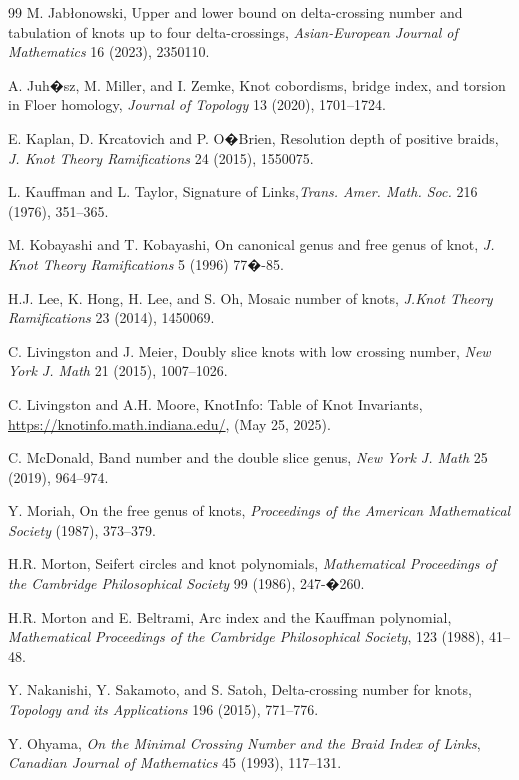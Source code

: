 \documentclass[pdftex, a4paper, 12pt, oneside]{amsart}
\numberwithin{equation}{section}
\theoremstyle{plain}
\theoremstyle{definition}
\begin{document}
\begin{thebibliography}{99}
		 M. Jab\l onowski, Upper and lower bound on delta-crossing number and tabulation of knots up to four delta-crossings, \emph{Asian-European Journal of Mathematics} 16 (2023), 2350110.
		
		 A. Juh�sz, M. Miller, and I. Zemke, Knot cobordisms, bridge index, and torsion in Floer homology,  \emph{Journal of Topology} 13 (2020), 1701--1724.
		
		 E. Kaplan, D. Krcatovich and P. O�Brien, Resolution depth of positive braids, \emph{J. Knot Theory Ramifications} 24 (2015), 1550075.
		
		 L. Kauffman and L. Taylor, Signature of Links,\emph{Trans. Amer. Math. Soc.} 216 (1976), 351--365.
		
		 M. Kobayashi and T. Kobayashi, On canonical genus and free genus of knot, \emph{J. Knot Theory Ramifications} 5 (1996) 77�-85.
		
		 H.J. Lee, K. Hong, H. Lee, and S. Oh, Mosaic number of knots, \emph{J.Knot Theory Ramifications} 23 (2014), 1450069. 
		
		 C. Livingston and J. Meier, Doubly slice knots with low crossing number, \emph{New York J. Math} 21 (2015), 1007--1026.
		
		 C. Livingston and A.H. Moore, KnotInfo: Table of Knot Invariants, \\\url{https://knotinfo.math.indiana.edu/}, (May 25, 2025).
		
		 C. McDonald, Band number and the double slice genus, \emph{New York J. Math} 25 (2019), 964--974.
		
		 Y. Moriah, On the free genus of knots, \emph{Proceedings of the American Mathematical Society} (1987), 373--379.
		
		 H.R. Morton, Seifert circles and knot polynomials, \emph{Mathematical Proceedings of the Cambridge Philosophical Society} 99 (1986), 247-�260.
		
		 H.R. Morton and E. Beltrami, Arc index and the Kauffman polynomial, \emph{Mathematical Proceedings of the Cambridge Philosophical Society}, 123 (1988), 41--48.
		
		 Y. Nakanishi, Y.  Sakamoto, and S. Satoh, Delta-crossing number for knots, \emph{Topology and its Applications} 196 (2015), 771--776.
		
		 Y. Ohyama, \emph{On the Minimal Crossing Number and the Braid Index of Links}, \emph{Canadian Journal of Mathematics} 45 (1993), 117--131.
		

\end{thebibliography}
\end{document}
